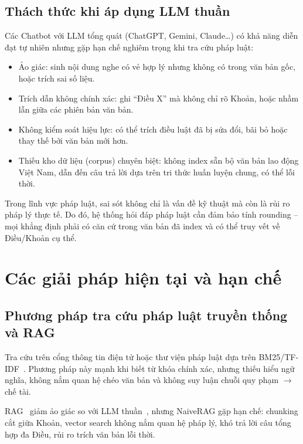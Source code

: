\documentclass[../DoAn.tex]{subfiles}
\begin{document}
\subsection{Thách thức khi áp dụng LLM thuần}
\label{subsection:1.1.3}

Các Chatbot với \gls{LLM} tổng quát (ChatGPT, Gemini, Claude\ldots) có khả năng diễn đạt tự nhiên nhưng gặp hạn chế nghiêm trọng khi tra cứu pháp luật:

\begin{itemize}[nosep, leftmargin=*]
    \item Ảo giác: sinh nội dung nghe có vẻ hợp lý nhưng không có trong văn bản gốc, hoặc trích sai số liệu.
    \item Trích dẫn không chính xác: ghi ``Điều X'' mà không chỉ rõ Khoản, hoặc nhầm lẫn giữa các phiên bản văn bản.
    \item Không kiểm soát hiệu lực: có thể trích điều luật đã bị sửa đổi, bãi bỏ hoặc thay thế bởi văn bản mới hơn.
    \item Thiếu kho dữ liệu (corpus) chuyên biệt: không index sẵn bộ văn bản lao động Việt Nam, dẫn đến câu trả lời dựa trên tri thức huấn luyện chung, có thể lỗi thời.
\end{itemize}

Trong lĩnh vực pháp luật, sai sót không chỉ là vấn đề kỹ thuật mà còn là rủi ro pháp lý thực tế. Do đó, hệ thống hỏi đáp pháp luật cần đảm bảo tính rounding -- mọi khẳng định phải có căn cứ trong văn bản đã index và có thể truy vết về Điều/Khoản cụ thể.

\section{Các giải pháp hiện tại và hạn chế}
\label{section:1.2}

\subsection{Phương pháp tra cứu pháp luật truyền thống và RAG}
\label{subsection:1.2.1}

Tra cứu trên cổng thông tin điện tử hoặc thư viện pháp luật dựa trên BM25/TF-IDF~\cite{robertson1994bm25}. Phương pháp này mạnh khi biết từ khóa chính xác, nhưng thiếu hiểu ngữ nghĩa, không nắm quan hệ chéo văn bản và không suy luận chuỗi quy phạm $\rightarrow$ chế tài.

\gls{RAG}~\cite{lewis2020rag} giảm ảo giác so với LLM thuần~\cite{ji2023hallucination}, nhưng \gls{NaiveRAG} gặp hạn chế: chunking cắt giữa Khoản, vector search không nắm quan hệ pháp lý, khó trả lời câu tổng hợp đa Điều, rủi ro trích văn bản lỗi thời.
\end{document}
